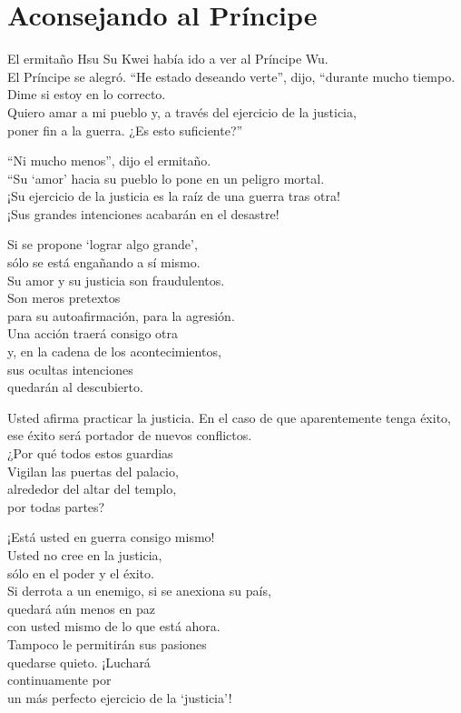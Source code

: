 \documentclass[book,b5paper,hidelinks,final]{memoir}
\begin{document}
	\chapter*{Aconsejando al Príncipe}
	
	El ermitaño Hsu Su Kwei había ido a ver al Príncipe Wu.\\
	El Príncipe se alegró. ``He estado deseando verte'', dijo, ``durante
	mucho tiempo.\\
	Dime si estoy en lo correcto.\\
	Quiero amar a mi pueblo y, a través del ejercicio de la justicia,\\
	poner fin a la guerra. ¿Es esto suficiente?''
	
	``Ni mucho menos'', dijo el ermitaño.\\
	``Su `amor' hacia su pueblo lo pone en un peligro mortal.\\
	¡Su ejercicio de la justicia es la raíz de una guerra tras otra!\\
	¡Sus grandes intenciones acabarán en el desastre!
	
	Si se propone `lograr algo grande',\\
	sólo se está engañando a sí mismo.\\
	Su amor y su justicia son fraudulentos.\\
	Son meros pretextos\\
	para su autoafirmación, para la agresión.\\
	Una acción traerá consigo otra\\
	y, en la cadena de los acontecimientos,\\
	sus ocultas intenciones\\
	quedarán al descubierto.
	
	Usted afirma practicar la justicia. En el caso de que aparentemente
	tenga éxito,\\
	ese éxito será portador de nuevos conflictos.\\
	¿Por qué todos estos guardias\\
	Vigilan las puertas del palacio,\\
	alrededor del altar del templo,\\
	por todas partes?
	
	¡Está usted en guerra consigo mismo!\\
	Usted no cree en la justicia,\\
	sólo en el poder y el éxito.\\
	Si derrota a un enemigo, si se anexiona su país,\\
	quedará aún menos en paz\\
	con usted mismo de lo que está ahora.\\
	Tampoco le permitirán sus pasiones\\
	quedarse quieto. ¡Luchará\\
	continuamente por\\
	un más perfecto ejercicio de la `justicia'!
	
\end{document}
